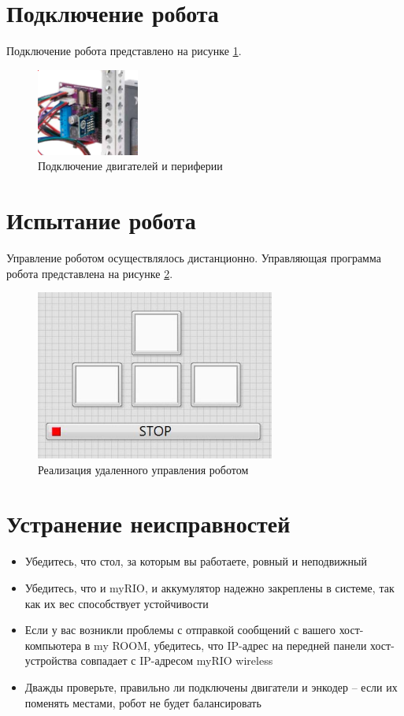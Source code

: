 \section{Подключение робота}
Подключение робота представлено на рисунке \ref{4connect}.
\begin{figure}[hb]
    \centering
    \includegraphics[width=0.3\textwidth]{fig/assembly/4.7.png}
    \caption{Подключение двигателей и периферии}
    \label{4connect}
\end{figure}

\newpage
\section{Испытание робота}
Управление роботом осуществлялось дистанционно.
Управляющая программа робота представлена на рисунке \ref{4prog}.
\begin{figure}[h]
    \centering
    \includegraphics[width=0.7\textwidth]{fig/assembly/4.8.jpg}
    \caption{Реализация удаленного управления роботом}
    \label{4prog}
\end{figure}

\section{Устранение неисправностей}
\begin{itemize}
    \item Убедитесь, что стол, за которым вы работаете, ровный и неподвижный
    \item Убедитесь, что и myRIO, и аккумулятор надежно закреплены в системе, так как их вес способствует устойчивости
    \item Если у вас возникли проблемы с отправкой сообщений с вашего хост-компьютера в my ROOM, убедитесь, что IP-адрес на передней панели хост-устройства совпадает с IP-адресом myRIO wireless
    \item Дважды проверьте, правильно ли подключены двигатели и энкодер -- если их поменять местами, робот не будет балансировать
\end{itemize}
